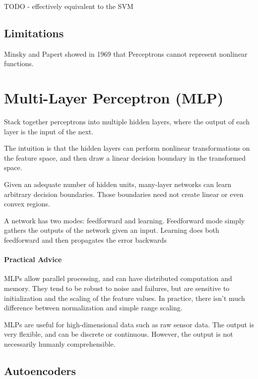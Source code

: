\documentclass{idc_msc}
\begin{document}
TODO - effectively equivalent to the SVM

\subsection{Limitations}

Minsky and Papert showed in 1969\cite{minsky1969perceptrons} that Perceptrons cannot represent nonlinear functions.


\clearpage
\section{Multi-Layer Perceptron (MLP)}

Stack together perceptrons into multiple hidden layers, where the output of each layer is the input of the next.


The intuition is that the hidden layers can perform nonlinear transformations on the feature space, and then draw a linear decision boundary in the transformed space.

Given an adequate number of hidden units, many-layer networks can learn arbitrary decision boundaries.
Those boundaries need not create linear or even convex regions.

A network has two modes: feedforward and learning.
Feedforward mode simply gathers the outputs of the network given an input.
Learning does both feedforward and then propagates the error backwards

\paragraph{Practical Advice}

MLPs allow parallel processing, and can have distributed computation and memory.
They tend to be robust to noise and failures, but are sensitive to initialization and the scaling of the feature values.
In practice, there isn't much difference between normalization and simple range scaling.

MLPs are useful for high-dimensional data such as raw sensor data.
The output is very flexible, and can be discrete or continuous.
However, the output is not necessarily humanly comprehensible.

\subsection{Autoencoders}
\end{document}
